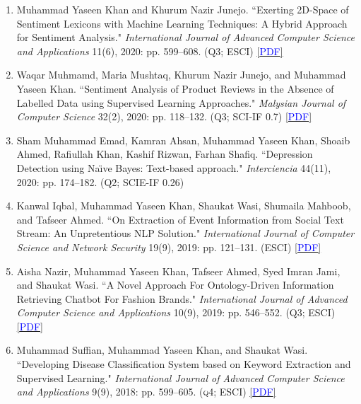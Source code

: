 \documentclass[10pt]{article}
\begin{document}
\begin{enumerate}
\item Muhammad Yaseen Khan and Khurum Nazir Junejo. ``Exerting 2D-Space of Sentiment Lexicons with Machine Learning Techniques: A Hybrid Approach for Sentiment Analysis." \emph{International Journal of Advanced Computer Science and Applications} 11(6), 2020: pp. 599--608. {\scshape (Q3; \textsc{ESCI})} \href{https://doi.org/10.14569/IJACSA.2020.0110672}{\scshape\small [\textcolor{blue}{PDF}]}

\item Waqar Muhmamd, Maria Mushtaq, Khurum Nazir Junejo, and Muhammad Yaseen Khan. ``Sentiment Analysis of Product Reviews in the Absence of Labelled Data using Supervised Learning Approaches." \emph{Malysian Journal of Computer Science} 32(2), 2020: pp. 118--132. {\scshape (Q3; \textsc{SCI-IF} 0.7)} \href{https://ejournal.um.edu.my/index.php/MJCS/article/view/23528}{\scshape\small [\textcolor{blue}{PDF}]}

\item Sham Muhammad Emad, Kamran Ahsan, Muhammad Yaseen Khan, Shoaib Ahmed, Rafiullah Khan, Kashif Rizwan, Farhan Shafiq. ``Depression Detection using Na\"{\i}ve Bayes: Text-based approach." \emph{Interciencia} 44(11), 2020: pp. 174--182. {\scshape (Q2; \textsc{SCIE-IF} 0.26)}

\item Kanwal Iqbal, Muhammad Yaseen Khan, Shaukat Wasi, Shumaila Mahboob, and Tafseer Ahmed. ``On Extraction of Event Information from Social Text Stream: An Unpretentious NLP Solution." \emph{International Journal of Computer Science and Network Security} 19(9), 2019: pp. 121--131. {\scshape (\textsc{ESCI})} \href{http://paper.ijcsns.org/07_book/201909/20190915.pdf}{\scshape\small [\textcolor{blue}{PDF}]}

\item Aisha Nazir, Muhammad Yaseen Khan, Tafseer Ahmed, Syed Imran Jami, and Shaukat Wasi. ``A Novel Approach For Ontology-Driven Information Retrieving Chatbot For Fashion Brands." \emph{International Journal of Advanced Computer Science and Applications} 10(9), 2019: pp. 546--552. {\scshape (Q3; \textsc{ESCI})} \href{https://doi.org/10.14569/IJACSA.2019.0100972}{\scshape\small [\textcolor{blue}{PDF}]}

\item Muhammad Suffian, Muhammad Yaseen Khan, and Shaukat Wasi. ``Developing Disease Classification System based on Keyword Extraction and Supervised Learning." \emph{International Journal of Advanced Computer Science and Applications} 9(9), 2018: pp. 599--605. {\scshape (q4; \textsc{ESCI})} \href{https://doi.org/10.14569/IJACSA.2018.090976}{\scshape\small [\textcolor{blue}{PDF}]}

\end{enumerate}
\end{document}
